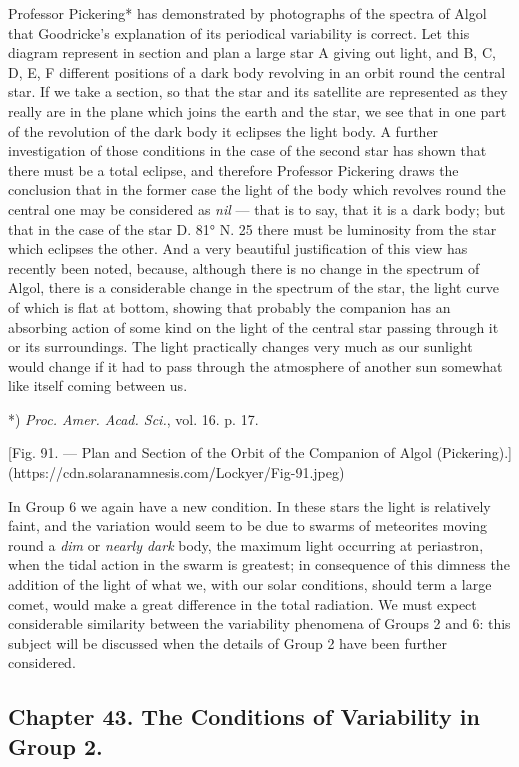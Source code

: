 \documentclass[a4paper, 12pt, oneside, polutonikogreek, english]{article}
\begin{document}
Professor Pickering* has demonstrated by photographs of the spectra of Algol that Goodricke's explanation of its periodical variability is correct. Let this diagram represent in section and plan a large star A giving out light, and B, C, D, E, F different positions of a dark body revolving in an orbit round the central star. If we take a section, so that the star and its satellite are represented as they really are in the plane which joins the earth and the star, we see that in one part of the revolution of the dark body it eclipses the light body. A further investigation of those conditions in the case of the second star has shown that there must be a total eclipse, and therefore Professor Pickering draws the conclusion that in the former case the light of the body which revolves round the central one may be considered as \emph{nil} --- that is to say, that it is a dark body; but that in the case of the star D. 81° N. 25 there must be luminosity from the star which eclipses the other. And a very beautiful justification of this view has recently been noted, because, although there is no change in the spectrum of Algol, there is a considerable change in the spectrum of the star, the light curve of which is flat at bottom, showing that probably the companion has an absorbing action of some kind on the light of the central star passing through it or its surroundings. The light practically changes very much as our sunlight would change if it had to pass through the atmosphere of another sun somewhat like itself coming between us.

*) \emph{Proc. Amer. Acad. Sci.}, vol. 16. p. 17.

[Fig. 91. --- Plan and Section of the Orbit of the Companion of Algol (Pickering).](https://cdn.solaranamnesis.com/Lockyer/Fig-91.jpeg)

In Group 6 we again have a new condition. In these stars the light is relatively faint, and the variation would seem to be due to swarms of meteorites moving round a \emph{dim} or \emph{nearly dark} body, the maximum light occurring at periastron, when the tidal action in the swarm is greatest; in consequence of this dimness the addition of the light of what we, with our solar conditions, should term a large comet, would make a great difference in the total radiation. We must expect considerable similarity between the variability phenomena of Groups 2 and 6: this subject will be discussed when the details of Group 2 have been further considered.

\subsection{Chapter 43. The Conditions of Variability in Group 2.}
\end{document}
